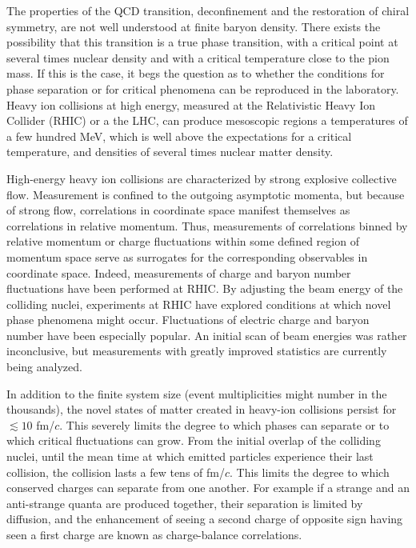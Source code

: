 \documentclass[aps,prc,nofootinbib,showpacs,superscriptaddress,groupedaddress]{revtex4-1}
\begin{document}
The properties of the QCD  transition, deconfinement and the restoration of chiral symmetry, are not well understood at finite baryon density. There exists the possibility that this transition is a true phase transition, with a critical point at several times nuclear density and with a critical temperature close to the pion mass. If this is the case, it begs the question as to whether the conditions for phase separation or for critical phenomena can be reproduced in the laboratory. Heavy ion collisions at high energy, measured at the Relativistic Heavy Ion Collider (RHIC) or a the LHC, can produce mesoscopic regions a temperatures of a few hundred MeV, which is well above the expectations for a critical temperature, and densities of several times nuclear matter density. 

High-energy heavy ion collisions are characterized by strong explosive collective flow. Measurement is confined to the outgoing asymptotic momenta, but because of strong flow, correlations in coordinate space manifest themselves as correlations in relative momentum. Thus, measurements of correlations binned by relative momentum or charge fluctuations within some defined region of momentum space serve as surrogates for the corresponding observables in coordinate space. Indeed, measurements of charge and baryon number fluctuations have been performed at RHIC. By adjusting the beam energy of the colliding nuclei, experiments at RHIC have explored conditions at which novel phase phenomena might occur. Fluctuations of electric charge and baryon number have been especially popular. An initial scan of beam energies was rather inconclusive, but measurements with greatly improved statistics are currently being analyzed. 

In addition to the finite system size (event multiplicities might number in the thousands), the novel states of matter created in heavy-ion collisions persist for $\lesssim 10$ fm/$c$. This severely limits the degree to which phases can separate or to which critical fluctuations can grow. From the initial overlap of the colliding nuclei, until the mean time at which emitted particles experience their last collision, the collision lasts a few tens of fm/$c$. This limits the degree to which conserved charges can separate from one another. For example if a strange and an anti-strange quanta are produced together, their separation is limited by diffusion, and the enhancement of seeing a second charge of opposite sign having seen a first charge are known as charge-balance correlations.
\end{document}
